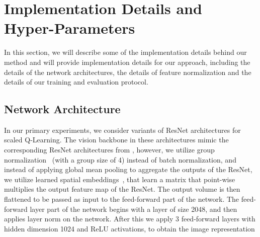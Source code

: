 \begin{table}[h]
    \centering
    \centering
    \vspace{-0.1cm}
    \caption{\footnotesize{{\textbf{Scaled QL with and without conservatism in terms of IQM human-normalized score in the 40-game setting} with ResNet 101. Observe that utilizing conservatism via CQL is still beneficial.}}} 
    \label{tab:ablation_no_pessimism_40_game}
    \vspace{0.25cm}
\end{table}

\vspace{-0.2cm}
\section{Implementation Details and Hyper-Parameters}
\vspace{-0.2cm}

In this section, we will describe some of the implementation details behind our method and will provide implementation details for our approach, including the details of the network architectures, the details of feature normalization and the details of our training and evaluation protocol.

\subsection{Network Architecture}
\label{sec:arch}

In our primary experiments, we consider variants of ResNet architectures for scaled Q-Learning. The vision backbone in these architectures mimic the corresponding ResNet architectures from \citet{resnet}, however, we utilize group normalization~\citep{wu2018group} (with a group size of 4) instead of batch normalization, and instead of applying global mean pooling to aggregate the outputs of the ResNet, we utilize learned spatial embeddings~\citep{kumar2022pre}, that learn a matrix that point-wise multiplies the output feature map of the ResNet. The output volume is then flattened to be passed as input to the feed-forward part of the network. The feed-forward layer part of the network begins with a layer of size 2048, and then applies layer norm on the network. After this we apply 3 feed-forward layers with hidden dimension 1024 and ReLU activations, to obtain the image representation 

